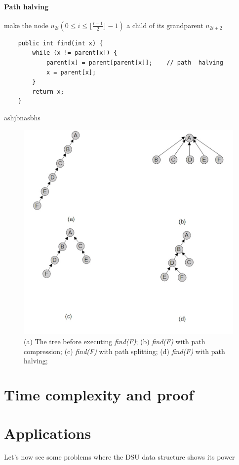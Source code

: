 \documentclass{article}
\begin{document}
\paragraph{Path halving} \cite{van1977alternative} \cite{van1980datastructures} make the node $u_{2i} ( 0 \leq i \leq \lfloor \frac{l-1}{2}\rfloor - 1)$ a child 
of its grandparent $u_{2i+2}$
\begin{lstlisting}
    public int find(int x) {
        while (x != parent[x]) {
            parent[x] = parent[parent[x]];    // path  halving
            x = parent[x];
        }
        return x;
    }
\end{lstlisting}
ashjbnasbhs
\begin{figure}
    \includegraphics[width = \linewidth]{img/pc.jpg}
    \caption{(a) The tree before executing \emph{find(F)};
    (b) \emph{find(F)} with path compression;
    (c) \emph{find(F)} with path splitting;
    (d) \emph{find(F)} with path halving;
    }
    \label{fig:pc}   
\end{figure}
\section{Time complexity and proof}
\section{Applications}
Let's now see some problems where the DSU data structure shows its power
\end{document}
